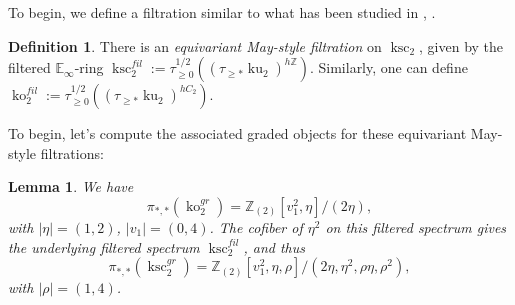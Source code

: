 \documentclass[11pt,leqno]{article}
\newcommand{\zz}{\mathbb{Z}}
\newcommand{\bb}[1]{\mathbb{#1}}
\DeclareMathOperator{\ksc}{ksc}
\DeclareMathOperator{\ko}{ko}
\newcommand{\mo}[1]{\operatorname{#1}}
\newtheorem*{short hand}{theorem name}
\theoremstyle{plain}  %
\newtheorem{lemma}{Lemma}[section]
\theoremstyle{definition}
\newtheorem{definition}{Definition}[section]
\numberwithin{equation}{section}
\begin{document}
To begin, we define a filtration similar to what has been studied in \cite{angeltveit2015algebraic}, \cite{lee2023topological}.
\begin{definition}\label{def6.1}
There is an \textit{equivariant May-style filtration} on $\ksc_2$, given by the filtered $\bb{E}_{\infty}$-ring $\ksc_2^{fil}:=\tau^{1/2}_{\geq 0}((\tau_{\geq *}\mo{ku}_2)^{h\zz})$.  Similarly, one can define $\ko_2^{fil}:=\tau^{1/2}_{\geq 0}((\tau_{\geq *}\mo{ku}_2)^{h C_2})$.
\end{definition}
To begin, let's compute the associated graded objects for these equivariant May-style filtrations:
\begin{lemma}\label{lem6.2}
We have $$\pi_{*,*}(\ko_2^{gr})=\zz_{(2)}[v_1^2,\eta]/(2\eta),$$ with $|\eta|=(1,2)$, $|v_1|=(0,4)$.  The cofiber of $\eta^2$ on this filtered spectrum gives the underlying filtered spectrum $\ksc_2^{fil}$, and thus $$\pi_{*,*}(\ksc_2^{gr})=\zz_{(2)}[v_1^2,\eta,\rho]/(2\eta, \eta^2,\rho\eta, \rho^2),$$ with $|\rho|=(1,4)$.
\end{lemma}
\end{document}
